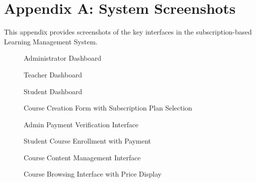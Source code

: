 \section*{Appendix A: System Screenshots}

This appendix provides screenshots of the key interfaces in the subscription-based Learning Management System.

\begin{figure}[h]
\centering
\caption{Administrator Dashboard}
\label{fig:admin-dashboard}
\end{figure}

\begin{figure}[h]
\centering
\caption{Teacher Dashboard}
\label{fig:teacher-dashboard-appendix}
\end{figure}

\begin{figure}[h]
\centering
\caption{Student Dashboard}
\label{fig:student-dashboard}
\end{figure}

\begin{figure}[h]
\centering
\caption{Course Creation Form with Subscription Plan Selection}
\label{fig:course-creation-form}
\end{figure}

\begin{figure}[h]
\centering
\caption{Admin Payment Verification Interface}
\label{fig:payment-verification-interface}
\end{figure}

\begin{figure}[h]
\centering
\caption{Student Course Enrollment with Payment}
\label{fig:student-enrollment}
\end{figure}

\begin{figure}[h]
\centering
\caption{Course Content Management Interface}
\label{fig:content-management}
\end{figure}

\begin{figure}[h]
\centering
\caption{Course Browsing Interface with Price Display}
\label{fig:course-browsing}
\end{figure}

